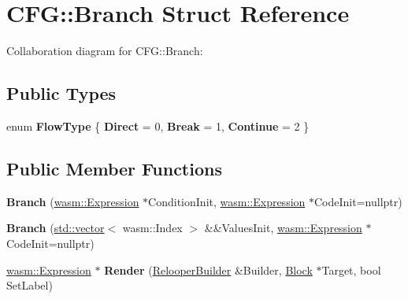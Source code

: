 \hypertarget{struct_c_f_g_1_1_branch}{}\section{C\+FG\+:\+:Branch Struct Reference}
\label{struct_c_f_g_1_1_branch}


Collaboration diagram for C\+FG\+:\+:Branch\+:
\subsection*{Public Types}
\begin{DoxyCompactItemize}
\item 
\mbox{\label{struct_c_f_g_1_1_branch_a7103f848b0003b11c2b5ce28311f64a6}} 
enum {\bfseries Flow\+Type} \{ {\bfseries Direct} = 0, 
{\bfseries Break} = 1, 
{\bfseries Continue} = 2
 \}
\end{DoxyCompactItemize}
\subsection*{Public Member Functions}
\begin{DoxyCompactItemize}
\item 
\mbox{\label{struct_c_f_g_1_1_branch_a0ffb999425fa3dd8d84a82acbe1d20bf}} 
{\bfseries Branch} (\mbox{\hyperlink{classwasm_1_1_expression}{wasm\+::\+Expression}} $\ast$Condition\+Init, \mbox{\hyperlink{classwasm_1_1_expression}{wasm\+::\+Expression}} $\ast$Code\+Init=nullptr)
\item 
\mbox{\label{struct_c_f_g_1_1_branch_a714dd1994d4251520231334bcea1a990}} 
{\bfseries Branch} (\mbox{\hyperlink{classstd_1_1vector}{std\+::vector}}$<$ wasm\+::\+Index $>$ \&\&Values\+Init, \mbox{\hyperlink{classwasm_1_1_expression}{wasm\+::\+Expression}} $\ast$Code\+Init=nullptr)
\item 
\mbox{\label{struct_c_f_g_1_1_branch_a619dbe24f55ee1abf7fb87f72d371b12}} 
\mbox{\hyperlink{classwasm_1_1_expression}{wasm\+::\+Expression}} $\ast$ {\bfseries Render} (\mbox{\hyperlink{class_c_f_g_1_1_relooper_builder}{Relooper\+Builder}} \&Builder, \mbox{\hyperlink{struct_c_f_g_1_1_block}{Block}} $\ast$Target, bool Set\+Label)
\end{DoxyCompactItemize}
